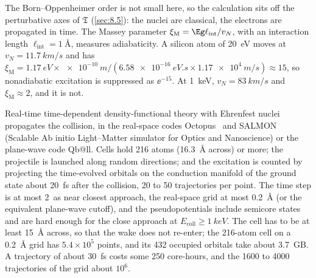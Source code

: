 The Born--Oppenheimer order is not small here, so the calculation sits off the perturbative axes of $\mathfrak{T}$ (\cref{sec:8.5}): the nuclei are classical, the electrons are propagated in time. The Massey parameter $\xi_{\mathrm{M}} = \Eg\ell_{\mathrm{int}}/v_N$, with an interaction length $\ell_{\mathrm{int}} = \SI{1}{\angstrom}$, measures adiabaticity. A silicon atom of \SI{20}{eV} moves at $v_N = \SI{11.7}{km/s}$ and has $\xi_{\mathrm{M}} = \SI{1.17}{eV}\times\SI{e-10}{m}/(\SI{6.58e-16}{eV.s}\times\SI{1.17e4}{m/s}) \approx 15$, so nonadiabatic excitation is suppressed as $\ee^{-15}$. At \SI{1}{keV}, $v_N = \SI{83}{km/s}$ and $\xi_{\mathrm{M}} \approx 2$, and it is not.

Real-time time-dependent density-functional theory with Ehrenfest nuclei propagates the collision, in the real-space codes Octopus~\cite{tancogne2020octopus} and SALMON (Scalable Ab initio Light--Matter simulator for Optics and Nanoscience) or the plane-wave code Qb@ll. Cells hold 216 atoms (\SI{16.3}{\angstrom} across) or more; the projectile is launched along random directions; and the excitation is counted by projecting the time-evolved orbitals on the conduction manifold of the ground state about \SI{20}{fs} after the collision, 20 to 50 trajectories per point. The time step is at most \SI{2}{as} near closest approach, the real-space grid at most \SI{0.2}{\angstrom} (or the equivalent plane-wave cutoff), and the pseudopotentials include semicore states and are hard enough for the close approach at $E_{\mathrm{coll}} \ge \SI{1}{keV}$. The cell has to be at least \SI{15}{\angstrom} across, so that the wake does not re-enter; the 216-atom cell on a \SI{0.2}{\angstrom} grid has $5.4\times10^5$ points, and its 432 occupied orbitals take about \SI{3.7}{GB}. A trajectory of about \SI{30}{fs} costs some 250 core-hours, and the 1600 to 4000 trajectories of the grid about $10^6$.

